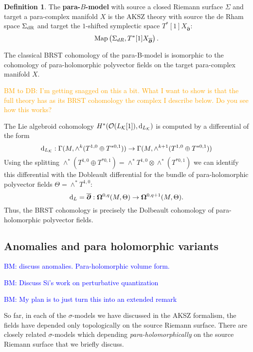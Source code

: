 \documentclass[letterpaper,12pt]{article}
\newcommand{\KK}{\mathcal{K}}
\newcommand{\cO}{\mathcal{O}}
\def\d{{\rm d}}
\newcommand{\p}{\partial}
\newcommand{\pd}{\overline{\bm{\p}}}
\theoremstyle{definition}
\newtheorem{Def}[theorem]{Definition}
\theoremstyle{remark}
\theoremstyle{examples}
\def\brian{\textcolor{blue}{BM: }\textcolor{blue}}
\def\btd{\textcolor{orange}{BM to DB: }\textcolor{orange}}
\begin{document}
\begin{Def}
The {\bf para-$B$-model} with source a closed Riemann surface $\Sigma$ and target a para-complex manifold $X$ is the AKSZ theory with source the de Rham space $\Sigma_{\rm dR}$ and target the $1$-shifted symplectic space $T^*[1] X_{\pd}$:
\[
{\rm Map}\left(\Sigma_{dR}, T^*[1]  X_{\pd}\right) .
\]
\end{Def}

The classical BRST cohomology of the para-B-model is isomorphic to the cohomology of para-holomorphic polyvector fields on the target para-complex manifold $X$.

\btd{I'm getting snagged on this a bit. 
What I want to show is that the full theory has as its BRST cohomology the complex I describe below. 
Do you see how this works?
}

The Lie algebroid cohomology $H^*(\cO(L_{\KK}[1]), \d_{L_\KK})$ is computed by a differential of the form
\[
\d_{L_\KK} : \Gamma(M , \wedge^k (T^{1,0} \oplus T^{*0,1})) \to \Gamma(M , \wedge^{k+1} (T^{1,0} \oplus T^{*0,1})) 
\]
Using the splitting $\wedge^*(T^{1,0} \oplus T^{*0,1}) = \wedge^* T^{1,0} \otimes \wedge^*(T^{*0,1})$ we can identify this differential with the Dobleault differential for the bundle of para-holomorphic polyvector fields $\Theta = \wedge^* T^{1,0}$:
\[
\d_L = \pd : \mathbf{\Omega}^{0,q} (M , \Theta) \to \mathbf{\Omega}^{0,q+1} (M , \Theta)  .
\]
Thus, the BRST cohomology is precisely the Dolbeault cohomology of para-holomorphic polyvector fields.


\subsection{Anomalies and para holomorphic variants}

\brian{discuss anomalies. Para-holomorphic volume form.}

\brian{Discuss Si's work on perturbative quantization}


\brian{My plan is to just turn this into an extended remark}

So far, in each of the $\sigma$-models we have discussed in the AKSZ formalism, the fields have depended only topologically on the source Riemann surface. 
There are closely related $\sigma$-models which depending {\em para-holomorphically} on the source Riemann surface that we briefly discuss. 
\end{document}
